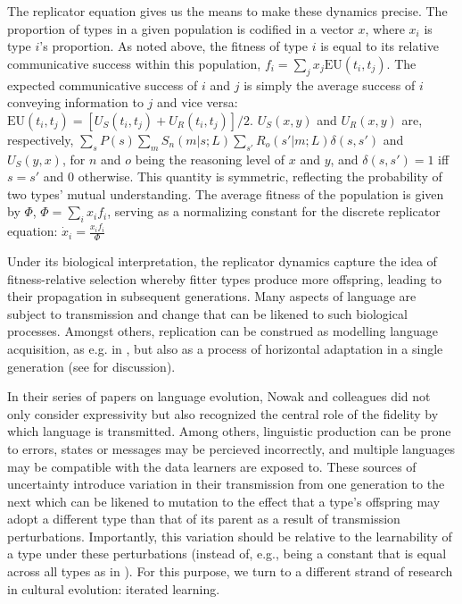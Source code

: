 \documentclass[a4paper]{article}
\begin{document}
The replicator equation gives us the means to make these dynamics precise. The proportion of types in a given population is codified in a vector $x$, where $x_i$ is type $i$'s proportion. As noted above, the fitness of type $i$ is equal to its relative communicative success within this population, $f_i = \sum_j x_j \text{EU}(t_i,t_j)$. The expected communicative success of $i$ and $j$ is simply the average success of $i$ conveying information to $j$ and vice versa: $\text{EU}(t_i,t_j) = [U_S(t_i,t_j) + U_R(t_i,t_j)]/2$. $U_S(x,y)$ and $U_R(x,y)$ are, respectively, $\sum_s P(s)\sum_m S_n(m|s;L) \sum_{s'} R_o(s'|m;L) \delta(s,s')$ and $U_S(y,x)$, for $n$ and $o$ being the reasoning level of $x$ and $y$, and $\delta(s,s') = 1$ iff $s = s'$ and $0$ otherwise. This quantity is symmetric, reflecting the probability of two types' mutual understanding. The average fitness of the population is given by $\Phi$, $\Phi = \sum_i x_i f_i$, serving as a normalizing constant for the discrete replicator equation: $\dot{x}_i = \frac{x_i f_i}{\Phi}$ 

Under its biological interpretation, the replicator dynamics capture the idea of fitness-relative selection whereby fitter types produce more offspring, leading to their propagation in subsequent generations. Many aspects of language are subject to transmission and change that can be likened to such biological processes. Amongst others, replication can be construed as modelling language acquisition, as e.g. in \citealt{nowak+etal:2002}, but also as a process of horizontal adaptation in a single generation (see \citealt[\S3.3]{benz+etal:2005b} for discussion).

In their series of papers on language evolution, Nowak and colleagues did not only consider expressivity but also recognized the central role of the fidelity by which language is transmitted. Among others, linguistic production can be prone to errors, states or messages may be percieved incorrectly, and multiple languages may be compatible with the data learners are exposed to. These sources of uncertainty introduce variation in their transmission from one generation to the next which can be likened to mutation to the effect that a type's offspring may adopt a different type than that of its parent as a result of transmission perturbations. Importantly, this variation should be relative to the learnability of a type under these perturbations (instead of, e.g., being a constant that is equal across all types as in \citealt{nowak+etal:2002}). For this purpose, we turn to a different strand of research in cultural evolution: iterated learning. 
\end{document}
